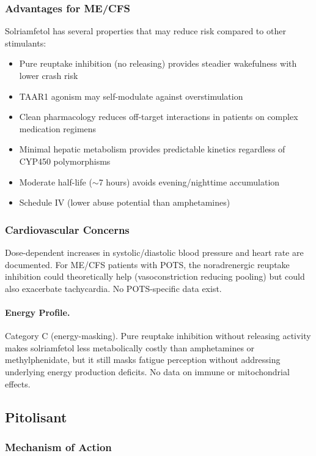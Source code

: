 \subsubsection{Advantages for ME/CFS}

Solriamfetol has several properties that may reduce risk compared to other stimulants:
\begin{itemize}
    \item Pure reuptake inhibition (no releasing) provides steadier wakefulness with lower crash risk
    \item TAAR1 agonism may self-modulate against overstimulation
    \item Clean pharmacology reduces off-target interactions in patients on complex medication regimens
    \item Minimal hepatic metabolism provides predictable kinetics regardless of CYP450 polymorphisms
    \item Moderate half-life (${\sim}$7 hours) avoids evening/nighttime accumulation
    \item Schedule IV (lower abuse potential than amphetamines)
\end{itemize}

\subsubsection{Cardiovascular Concerns}

Dose-dependent increases in systolic/diastolic blood pressure and heart rate are documented. For ME/CFS patients with POTS, the noradrenergic reuptake inhibition could theoretically help (vasoconstriction reducing pooling) but could also exacerbate tachycardia. No POTS-specific data exist.

\paragraph{Energy Profile.}
Category C (energy-masking). Pure reuptake inhibition without releasing activity makes solriamfetol less metabolically costly than amphetamines or methylphenidate, but it still masks fatigue perception without addressing underlying energy production deficits. No data on immune or mitochondrial effects.

\subsection{Pitolisant}
\label{subsec:pitolisant}

\subsubsection{Mechanism of Action}

